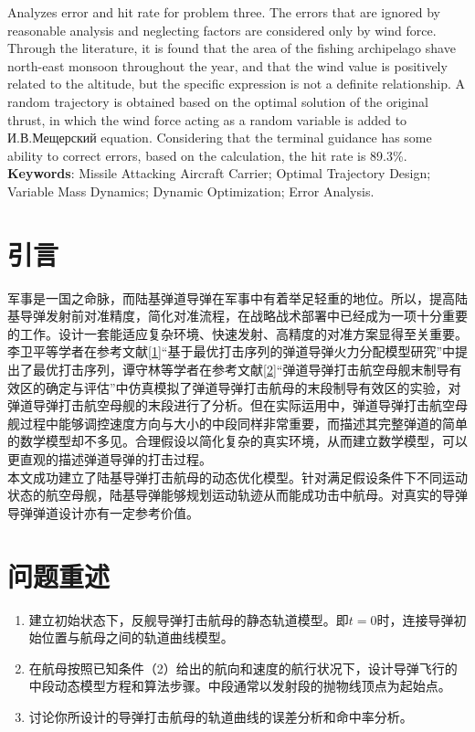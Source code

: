 \documentclass[UTF8]{article}
\begin{document}
\indent Analyzes error and hit rate for problem three. The errors that are ignored by reasonable analysis and neglecting factors are considered only by wind force. Through the literature, it is found that the area of the fishing archipelago shave north-east monsoon throughout the year, and that the wind value is positively related to the altitude, but the specific expression is not a definite relationship. A random trajectory is obtained based on the optimal solution of the original thrust, in which the wind force acting as a random variable is added to И.В.Мещерский equation. Considering that the terminal guidance has some ability to correct errors, based on the calculation, the hit rate is 89.3\%.\\
\textbf{Keywords}: Missile Attacking Aircraft Carrier; Optimal Trajectory Design; Variable Mass Dynamics; Dynamic Optimization; Error Analysis.
\normalsize

\newpage
\thispagestyle{empty}
\tableofcontents
\newpage
\setcounter{page}{1}
\section{引言}
军事是一国之命脉，而陆基弹道导弹在军事中有着举足轻重的地位。所以，提高陆基导弹发射前对准精度，简化对准流程，在战略战术部署中已经成为一项十分重要的工作。设计一套能适应复杂环境、快速发射、高精度的对准方案显得至关重要。\\
\indent 李卫平等学者在参考文献\ref{1}“基于最优打击序列的弹道导弹火力分配模型研究”中提出了最优打击序列，谭守林等学者在参考文献\ref{2}“弹道导弹打击航空母舰末制导有效区的确定与评估''中仿真模拟了弹道导弹打击航母的末段制导有效区的实验，对弹道导弹打击航空母舰的末段进行了分析。但在实际运用中，弹道导弹打击航空母舰过程中能够调控速度方向与大小的中段同样非常重要，而描述其完整弹道的简单的数学模型却不多见。合理假设以简化复杂的真实环境，从而建立数学模型，可以更直观的描述弹道导弹的打击过程。\\
\indent 本文成功建立了陆基导弹打击航母的动态优化模型。针对满足假设条件下不同运动状态的航空母舰，陆基导弹能够规划运动轨迹从而能成功击中航母。对真实的导弹导弹弹道设计亦有一定参考价值。
\section{问题重述}
\begin{enumerate}[1]
\item 建立初始状态下，反舰导弹打击航母的静态轨道模型。即\(t=0\)时，连接导弹初始位置与航母之间的轨道曲线模型。
\item 在航母按照已知条件（2）给出的航向和速度的航行状况下，设计导弹飞行的中段动态模型方程和算法步骤。中段通常以发射段的抛物线顶点为起始点。
\item 讨论你所设计的导弹打击航母的轨道曲线的误差分析和命中率分析。
\end{enumerate}
\end{document}
